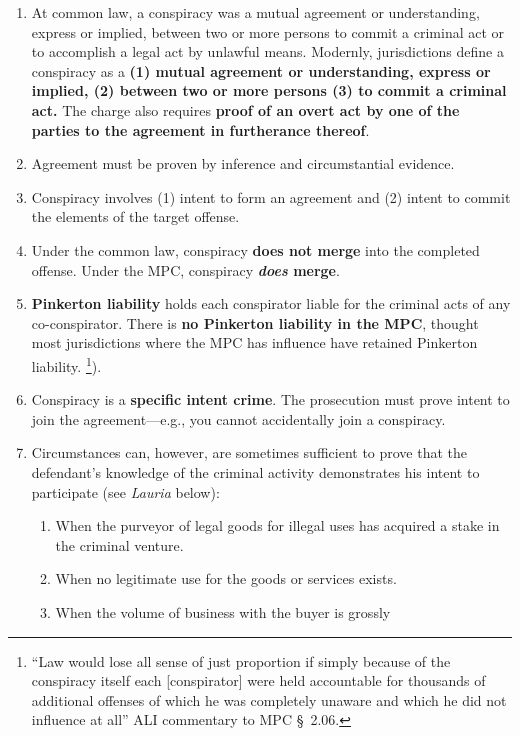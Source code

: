 \begin{enumerate}
    \item At common law, a conspiracy was a mutual agreement or understanding, 
    express or implied, between two or more persons to commit a criminal act 
    or to accomplish a legal act by unlawful means.  Modernly, jurisdictions 
    define a conspiracy as a \textbf{(1) mutual agreement or understanding, 
    express or implied, (2) between two or more persons (3) to commit a 
    criminal act.} The charge also requires \textbf{proof of an overt act by 
    one of the parties to the agreement in furtherance thereof}.
    \item Agreement must be proven by inference and circumstantial evidence.
    \item Conspiracy involves (1) intent to form an agreement and (2) intent 
    to commit the elements of the target offense.
    \item Under the common law, conspiracy \textbf{does not merge} into the 
    completed offense. Under the MPC, conspiracy \textbf{\emph{does} merge}.
    \item \textbf{Pinkerton liability} holds each conspirator liable for the 
    criminal acts of any co-conspirator. There is \textbf{no Pinkerton 
    liability in the MPC}, thought most jurisdictions where the MPC has 
    influence have retained Pinkerton liability. \footnote{``Law would lose all sense of just proportion if 
    simply because of the conspiracy itself each [conspirator] were held 
    accountable for thousands of additional offenses of which he was 
    completely unaware and which he did not influence at all'' ALI 
    commentary to MPC \S\ 2.06.}).
    \item Conspiracy is a \textbf{specific intent crime}. The prosecution must 
    prove intent to join the agreement---e.g., you cannot accidentally join a 
    conspiracy.
    \item Circumstances can, however, are sometimes sufficient to prove that 
    the defendant's knowledge of the criminal activity demonstrates his intent 
    to participate (see \emph{Lauria} below):
    \begin{enumerate}
        \item When the purveyor of legal goods for illegal uses has acquired a 
        stake in the criminal venture.
        \item When no legitimate use for the goods or services exists.
        \item When the volume of business with the buyer is grossly 

\end{enumerate}
\end{enumerate}
